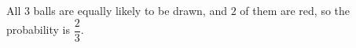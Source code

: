 All $3$ balls are equally likely to be drawn, and $2$ of them are red, so the probability is $\boxed{\dfrac23}$.
